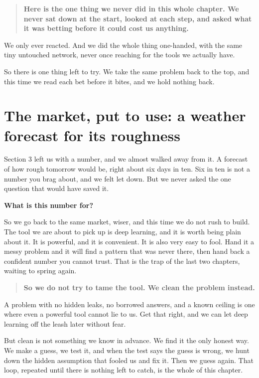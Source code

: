 \documentclass[11pt]{article} %
\begin{document}
\begin{quote}
\textbf{Here is the one thing we never did in this whole chapter. We never sat down at the start, looked at each step, and asked what it was betting before it could cost us anything.}
\end{quote}


We only ever reacted. And we did the whole thing one-handed, with the same tiny untouched network, never once reaching for the tools we actually have.

So there is one thing left to try. We take the same problem back to the top, and this time we read each bet before it bites, and we hold nothing back.


\section{The market, put to use: a weather forecast for its roughness}


Section 3 left us with a number, and we almost walked away from it. A forecast of how rough tomorrow would be, right about six days in ten. Six in ten is not a number you brag about, and we felt let down. But we never asked the one question that would have saved it.

\textbf{What is this number for?}

So we go back to the same market, wiser, and this time we do not rush to build. The tool we are about to pick up is deep learning, and it is worth being plain about it. It is powerful, and it is convenient. It is also very easy to fool. Hand it a messy problem and it will find a pattern that was never there, then hand back a confident number you cannot trust. That is the trap of the last two chapters, waiting to spring again.


\begin{quote}
\textbf{So we do not try to tame the tool. We clean the problem instead.}
\end{quote}


A problem with no hidden leaks, no borrowed answers, and a known ceiling is one where even a powerful tool cannot lie to us. Get that right, and we can let deep learning off the leash later without fear.

But clean is not something we know in advance. We find it the only honest way. We make a guess, we test it, and when the test says the guess is wrong, we hunt down the hidden assumption that fooled us and fix it. Then we guess again. That loop, repeated until there is nothing left to catch, is the whole of this chapter.
\end{document}
